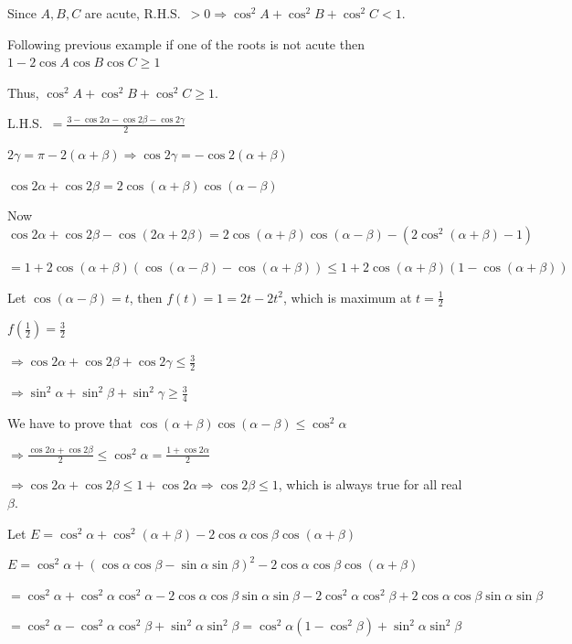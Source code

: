   Since $A, B, C$ are acute, R.H.S.\ $> 0\Rightarrow \cos^2A + \cos^2B + \cos^2C < 1$.
\item Following previous example if one of the roots is not acute then $1 - 2\cos A\cos B\cos C \geq 1$

  Thus, $\cos^2A + \cos^2B + \cos^2C \geq 1$.
\item L.H.S.\ $= \frac{3 - \cos2\alpha - \cos2\beta - \cos2\gamma}{2}$

  $2\gamma = \pi - 2(\alpha + \beta)\Rightarrow \cos2\gamma = - \cos2(\alpha + \beta)$

  $\cos2\alpha + \cos2\beta = 2\cos(\alpha + \beta)\cos(\alpha - \beta)$

  Now $\cos2\alpha + \cos2\beta - \cos(2\alpha + 2\beta) = 2\cos(\alpha + \beta)\cos(\alpha - \beta) -
  (2\cos^2(\alpha + \beta) - 1)$

  $= 1 + 2\cos(\alpha + \beta)(\cos(\alpha - \beta) - \cos(\alpha + \beta)) \leq 1 + 2\cos(\alpha + \beta)(1
  - \cos(\alpha + \beta))$

  Let $\cos(\alpha - \beta) = t$, then $f(t) = 1 = 2t - 2t^2$, which is maximum at $t = \frac{1}{2}$

  $f\left(\frac{1}{2}\right) = \frac{3}{2}$

  $\Rightarrow \cos2\alpha + \cos2\beta + \cos2\gamma\leq \frac{3}{2}$

  $\Rightarrow \sin^2\alpha + \sin^2\beta + \sin^2\gamma \geq \frac{3}{4}$
\item We have to prove that $\cos(\alpha + \beta)\cos(\alpha - \beta)\leq \cos^2\alpha$

  $\Rightarrow \frac{\cos2\alpha + \cos2\beta}{2}\leq \cos^2\alpha = \frac{1 + \cos2\alpha}{2}$

  $\Rightarrow \cos2\alpha + \cos2\beta\leq 1 + \cos2\alpha \Rightarrow \cos2\beta\leq 1$, which is always
  true for all real $\beta$.
\item Let $E = \cos^2\alpha + \cos^2(\alpha + \beta) - 2\cos\alpha\cos\beta\cos(\alpha + \beta)$

  $E = \cos^2\alpha + (\cos\alpha\cos\beta - \sin\alpha\sin\beta)^2 - 2\cos\alpha\cos\beta\cos(\alpha +
  \beta)$

  $= \cos^2\alpha + \cos^2\alpha\cos^2\alpha - 2\cos\alpha\cos\beta\sin\alpha\sin\beta -
  2\cos^2\alpha\cos^2\beta + 2\cos\alpha\cos\beta\sin\alpha\sin\beta$

  $= \cos^2\alpha - \cos^2\alpha\cos^2\beta + \sin^2\alpha\sin^2\beta = \cos^2\alpha(1 - \cos^2\beta) +
  \sin^2\alpha\sin^2\beta$

